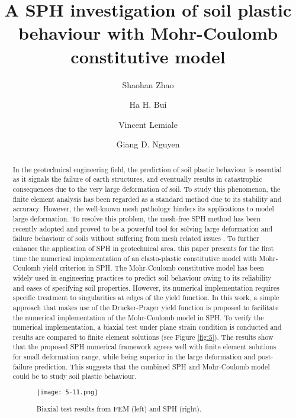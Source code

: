 \documentclass[10pt]{article}
\title{A SPH investigation of soil plastic behaviour with Mohr-Coulomb
constitutive model}
\date{}
\author[1]{Shaohan Zhao}
\author[1]{Ha H. Bui}
\author[2]{Vincent Lemiale}
\author[3]{Giang D. Nguyen}
\affil[1]{MCG Lab, Department of Civil Engineering, Monash University, Australia}
\affil[2]{Data61, CSIRO, Clayton South, Vic 3169, Australia}
\affil[3]{School of Civil Environmental and Mining Engineering, The University of Adelaide, Australia}
\begin{document}
\maketitle


\begin{abstract}
In the geotechnical engineering field, the prediction of soil plastic behaviour is essential as it signals the failure of earth structures, and eventually results in catastrophic consequences due to the very large deformation of soil. To study this phenomenon, the finite element analysis has been regarded as a standard method due to its stability and accuracy. However, the well-known mesh pathology hinders its applications to model large deformation. To resolve this problem, the mesh-free SPH method has been recently adopted and proved to be a powerful tool for solving large deformation and failure behaviour of soils without suffering from mesh related issues \cite{ha2007lagrangian}. To further enhance the application of SPH in geotechnical area, this paper presents for the first time the numerical implementation of an elasto-plastic constitutive model with Mohr-Coulomb yield criterion in SPH. The Mohr-Coulomb constitutive model has been widely used in engineering practices to predict soil behaviour owing to its reliability and eases of specifying soil properties. However, its numerical implementation requires specific treatment to singularities at edges of the yield function. In this work, a simple approach that makes use of the Drucker-Prager yield function is proposed to facilitate the numerical implementation of the Mohr-Coulomb model in SPH. To verify the numerical implementation, a biaxial test under plane strain condition is conducted and results are compared to finite element solutions (see Figure \ref{fig:5}). The results show that the proposed SPH numerical framework agrees well with finite element solutions for small deformation range, while being superior in the large deformation and post-failure prediction. This suggests that the combined SPH and Mohr-Coulomb model could be to study soil plastic behaviour.

\begin{figure}[!htb]
\centering
\texttt{[image: 5-11.png]}
\caption{Biaxial test results from FEM (left) and SPH (right).}\label{fig:5}
\end{figure}

\end{abstract}



\addbib
\end{document}
